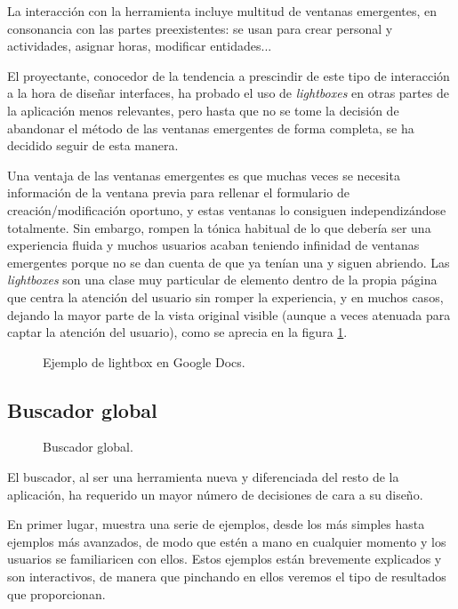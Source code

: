 La interacción con la herramienta incluye multitud de ventanas emergentes, en
consonancia con las partes preexistentes: se usan para crear personal y
actividades, asignar horas, modificar entidades...

El proyectante, conocedor de la tendencia a prescindir de este tipo de
interacción a la hora de diseñar interfaces, ha probado el uso de
\textit{lightboxes} en otras partes de la aplicación menos relevantes, pero
hasta que no se tome la decisión de abandonar el método de las ventanas
emergentes de forma completa, se ha decidido seguir de esta manera.

Una ventaja de las ventanas emergentes es que muchas veces se necesita
información de la ventana previa para rellenar el formulario de
creación/modificación oportuno, y estas ventanas lo consiguen independizándose
totalmente. Sin embargo, rompen la tónica habitual de lo que debería ser una
experiencia fluida y muchos usuarios acaban teniendo infinidad de ventanas
emergentes porque no se dan cuenta de que ya tenían una y siguen abriendo. Las
\textit{lightboxes} son una clase muy particular de elemento dentro de la propia
página que centra la atención del usuario sin romper la experiencia, y en muchos
casos, dejando la mayor parte de la vista original visible (aunque a veces
atenuada para captar la atención del usuario), como se aprecia en la figura
\ref{fig:ventana_modal}.

\begin{figure}
\centering
{}
\caption{Ejemplo de lightbox en Google Docs.}
\label{fig:ventana_modal}
\end{figure}

\subsection{Buscador global}

\begin{figure}
\centering
{}
\caption{Buscador global.}
\label{fig:buscador_inicio0}
\end{figure}

El buscador, al ser una herramienta nueva y diferenciada del resto de la
aplicación, ha requerido un mayor número de decisiones de cara a su diseño.

En primer lugar, muestra una serie de ejemplos, desde los más simples hasta
ejemplos más avanzados, de modo que estén a mano en cualquier momento y los
usuarios se familiaricen con ellos. Estos ejemplos están brevemente explicados y
son interactivos, de manera que pinchando en ellos veremos el tipo de resultados
que proporcionan.


